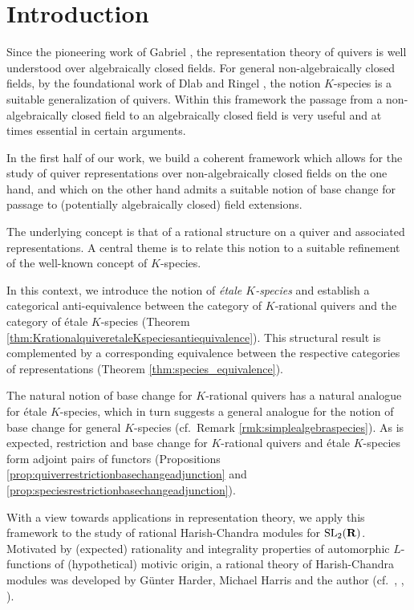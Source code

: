 \documentclass[a4paper,12pt,reqno]{amsart}
\newcommand{\RR}{{\rm\bf R}}
\DeclareMathOperator{\SL}{\mathrm{SL}}
\theoremstyle{plain}
\theoremstyle{remark}
\begin{document}
    {\tiny
      \tableofcontents
    }

    \section*{Introduction}

    Since the pioneering work of Gabriel \cite{Gabriel1972}, the representation theory of quivers is well understood over algebraically closed fields. For general non-algebraically closed fields, by the foundational work of Dlab and Ringel \cite{DlabRingel1975,DlabRingel1976}, the notion $K$-species is a suitable generalization of quivers. Within this framework the passage from a non-algebraically closed field to an algebraically closed field is very useful and at times essential in certain arguments.

    In the first half of our work, we build a coherent framework which allows for the study of quiver representations over non-algebraically closed fields on the one hand, and which on the other hand admits a suitable notion of base change for passage to (potentially algebraically closed) field extensions.

    The underlying concept is that of a rational structure on a quiver and associated representations. A central theme is to relate this notion to a suitable refinement of the well-known concept of $K$-species.

    In this context, we introduce the notion of {\em \'etale $K$-species} and establish a categorical anti-equivalence between the category of $K$-rational quivers and the category of \'etale $K$-species (Theorem \ref{thm:KrationalquiveretaleKspeciesantiequivalence}). This structural result is complemented by a corresponding equivalence between the respective categories of representations (Theorem \ref{thm:species_equivalence}).

    The natural notion of base change for $K$-rational quivers has a natural analogue for \'etale $K$-species, which in turn suggests a general analogue for the notion of base change for general $K$-species (cf.\ Remark \ref{rmk:simplealgebraspecies}). As is expected, restriction and base change for $K$-rational quivers and \'etale $K$-species form adjoint pairs of functors (Propositions \ref{prop:quiverrestrictionbasechangeadjunction} and \ref{prop:speciesrestrictionbasechangeadjunction}).

    \smallskip
    With a view towards applications in representation theory, we apply this framework to the study of rational Harish-Chandra modules for $\SL_2(\RR)$. Motivated by (expected) rationality and integrality properties of automorphic $L$-functions of (hypothetical) motivic origin, a rational theory of Harish-Chandra modules was developed by G\"unter Harder, Michael Harris and the author (cf.\ \cite{HarderRaghuram-Book}, \cite{Harris2012,Harris2020Erratum}, \cite{Januszewski18}).
\end{document}
